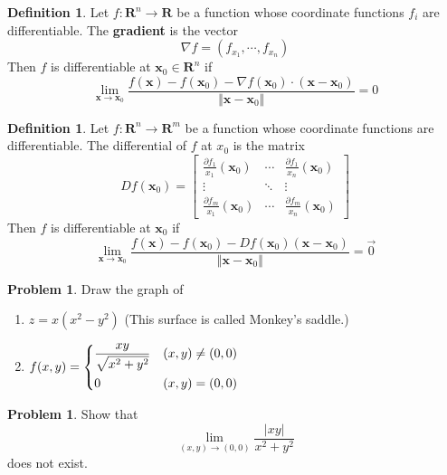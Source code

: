 \documentclass{beamer}
\theoremstyle{plain}
\theoremstyle{definition}
\newtheorem{defn}[thm]{Definition}
\newtheorem{prob}[thm]{Problem}
\begin{document}
\begin{frame}
\begin{defn}
	Let $f:\mathbf R^n\to\mathbf R$ be a function
	whose coordinate functions $f_i$ are differentiable.
	The \textbf{gradient} is the vector	
		$$\nabla f = (f_{x_1},\cdots,f_{x_n})$$
	Then $f$ is differentiable at 
	$\mathbf x_0\in\mathbf R^n$ if 
	$$\lim_{\mathbf x\to\mathbf x_0}
		\frac{f(\mathbf x) - f(\mathbf x_0) 
		- \nabla f(\mathbf x_0)
		\cdot(\mathbf x-\mathbf x_0)}
		{\Vert\mathbf x-\mathbf x_0\Vert} = 0$$
\end{defn}
\end{frame}

\begin{frame}
\begin{defn}
	Let $f:\mathbf R^n\to\mathbf R^m$ be a function
	whose coordinate functions are differentiable.
	The differential of $f$ at $x_0$ is the matrix
	$$Df(\mathbf x_0)
	 = \begin{bmatrix} 
	\frac{\partial f_1}{x_1}(\mathbf x_0) & \cdots 
		& \frac{\partial f_1}{x_n}(\mathbf x_0) \\
	\vdots & \ddots & \vdots \\
	\frac{\partial f_m}{x_1}(\mathbf x_0) & \cdots
		& \frac{\partial f_m}{x_n}(\mathbf x_0) 
	   \end{bmatrix}$$
	Then $f$ is differentiable at $\mathbf x_0$ if
	$$\lim_{\mathbf x\to\mathbf x_0}
	\frac{f(\mathbf x) - f(\mathbf x_0) 
	- Df(\mathbf x_0)
	(\mathbf x - \mathbf x_0)}
	{\Vert \mathbf x - \mathbf x_0\Vert} = \vec 0$$
\end{defn}	
\end{frame}

\begin{frame}
\begin{prob}
	Draw the graph of 
	\begin{enumerate}
	\item $z = x(x^2-y^2)$ 
	(This surface is called Monkey's saddle.)
	\item $f(x,y)=\begin{dcases}
	\frac{xy}{\sqrt{x^2+y^2}} & (x,y)\neq(0,0)\\
	0 & (x,y)=(0,0)\end{dcases}$
	\end{enumerate}
\end{prob}
\end{frame}

\begin{frame}
\begin{prob}
	Show that 
	$$\lim_{(x,y)\to(0,0)} \frac{|xy|}{x^2+y^2}$$
	does not exist.
\end{prob}
\end{frame}
\end{document}
